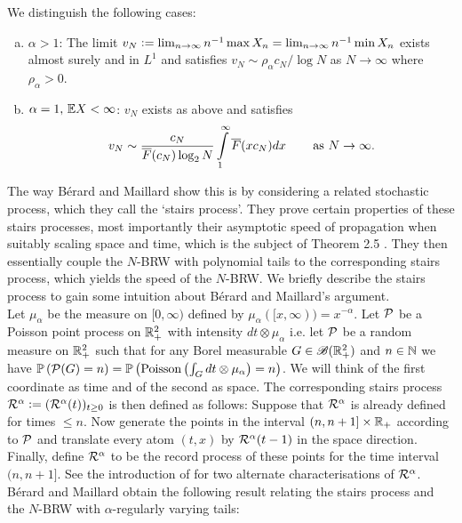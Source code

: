 \begin{theorem}
We distinguish the following cases:
\begin{enumerate}[(a)]

\item \vspace{-2mm} $\alpha > 1$: The limit $v_N \defeq \lim_{n \to \infty} n^{-1} \max X_n = \lim_{n \to \infty} n^{-1} \min X_n$ exists almost surely and in $L^1$ and satisfies $v_N \sim \rho_\alpha c_N / \log N$ as $N \to \infty$ where $\rho_\alpha > 0$. \\

\item \vspace{-6mm} $\alpha = 1,\, \E X < \infty$: $v_N$ exists as above and satisfies 
\begin{equation}
v_N \sim \frac{c_N}{\overline{F}(c_N)\log_2 N} \int\limits^\infty_1 \overline{F}(x c_N) dx \qquad\,\text{as }N \to \infty. \\
\end{equation}
\end{enumerate}
\end{theorem}

The way Bérard and Maillard show this is by considering a related stochastic process, which they call the `stairs process'. They prove certain properties of these stairs processes, most importantly their asymptotic speed of propagation when suitably scaling space and time, which is the subject of Theorem 2.5 \cite{poly_tails}. They then essentially couple the $N$-BRW with polynomial tails to the corresponding stairs process, which yields the speed of the $N$-BRW. We briefly describe the stairs process to gain some intuition about Bérard and Maillard's argument. \\


Let $\mu_\alpha$ be the measure on $[0, \infty)$ defined by $\mu_\alpha([x, \infty)) = x^{-\alpha}$. Let $\cal{P}$ be a Poisson point process on $\R_+^2$ with intensity $dt \otimes \mu_\alpha$ i.e. let $\cal{P}$ be a random measure on $\R_+^2$ such that for any Borel measurable $G \in \scr{B}(\R_+^2)$ and $n \in \N$ we have $\Pr{\cal{P}(G) = n} = \Pr{\dPo{\int_G dt \otimes \mu_\alpha} = n}$. We will think of the first coordinate as time and of the second as space. The corresponding stairs process $\cal{R}^\alpha \defeq (\cal{R}^\alpha (t))_{t \geq 0}$ is then defined as follows: Suppose that $\cal{R}^\alpha$ is already defined for times $ \leq n$. Now generate the points in the interval $(n, n+1] \times \R_+$ according to $\cal{P}$ and translate every atom $(t,x)$ by $\cal{R}^\alpha (t-1)$ in the space direction. Finally, define $\cal{R}^\alpha$ to be the record process of these points for the time interval $(n, n+1]$. See the introduction of \cite{poly_tails} for two alternate characterisations of $\cal{R}^\alpha$. Bérard and Maillard obtain the following result relating the stairs process and the $N$-BRW with $\alpha$-regularly varying tails:

